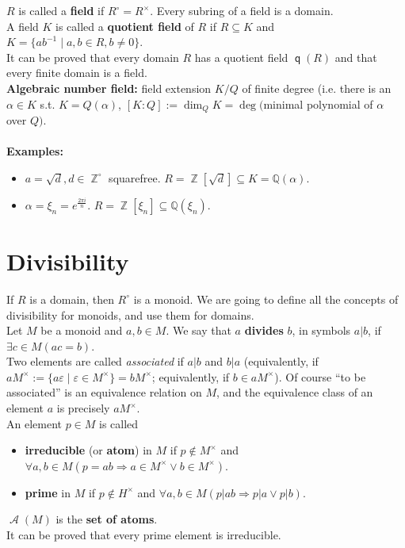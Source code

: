 \documentclass[12pt,a4paper]{report}
\theoremstyle{definition}
\theoremstyle{num.custom-title}
\DeclareMathOperator{\A}{\mathcal{A}}
\DeclareMathOperator{\Z}{\mathbb{Z}}
\DeclareMathOperator{\imp}{\Rightarrow}
\DeclareMathOperator{\sse}{\subseteq}
\DeclareMathOperator{\q}{\mathsf{q}}
\newcommand{\Q}{\mathbb{Q}}
\renewcommand{\epsilon}{\varepsilon}
\begin{document}
$R$ is called a \textbf{field} if $R^\circ=R^\times$. Every subring of a field is a domain.\\
A field $K$ is called a \textbf{quotient field} of $R$ if $R \sse K$ and $K=\{a b^{-1} \mid a,b \in R, b \neq 0\}$.\\
It can be proved that every domain $R$ has a quotient field $\q(R)$ and that every finite domain is a field.\\
\textbf{Algebraic number field:} field extension $K/Q$ of finite degree (i.e. there is an $\alpha \in K$ s.t. $K=Q(\alpha)$, $[K:Q]:=\dim_Q K = \deg($minimal polynomial of $\alpha$ over $Q)$.\\
\\
\textbf{Examples:}
\begin{itemize}
\item $a=\sqrt{d}, d \in \Z^\circ$ squarefree. $R=\Z[\sqrt{d}] \sse K=\Q(\alpha)$.
\item $\alpha= \xi_n = e^{\frac{2\pi i}{n}}$. $R=\Z[\xi_n] \sse \Q(\xi_n)$.
\end{itemize}


\section{Divisibility}

If $R$ is a domain, then $R^\circ$ is a monoid. We are going to define all the concepts of divisibility for monoids, and use them for domains.\\
Let $M$ be a monoid and $a,b \in M$. We say that $a$ \textbf{divides} $b$, in symbols $a|b$, if $\exists c \in M (ac=b)$.\\
Two elements are called \emph{associated} if $a|b$ and $b|a$ (equivalently, if $aM^\times := \{a\epsilon \mid \epsilon \in M^\times\} = bM^\times$; equivalently, if $b \in aM^\times$). Of course ``to be associated'' is an equivalence relation on $M$, and the equivalence class of an element $a$ is precisely $aM^\times$.\\
An element $p \in M$ is called 
\begin{itemize}
\item \textbf{irreducible} (or \textbf{atom}) in $M$ if $p \not\in M^\times$ and $\forall a,b \in M (p=ab \imp a \in M^\times \vee b \in M^\times)$.
\item \textbf{prime} in $M$ if $p \not\in H^\times$ and $\forall a,b \in M (p|ab \imp p|a \vee p|b)$.
\end{itemize}
$\A(M)$ is the \textbf{set of atoms}.\\
It can be proved that every prime element is irreducible.
\end{document}
